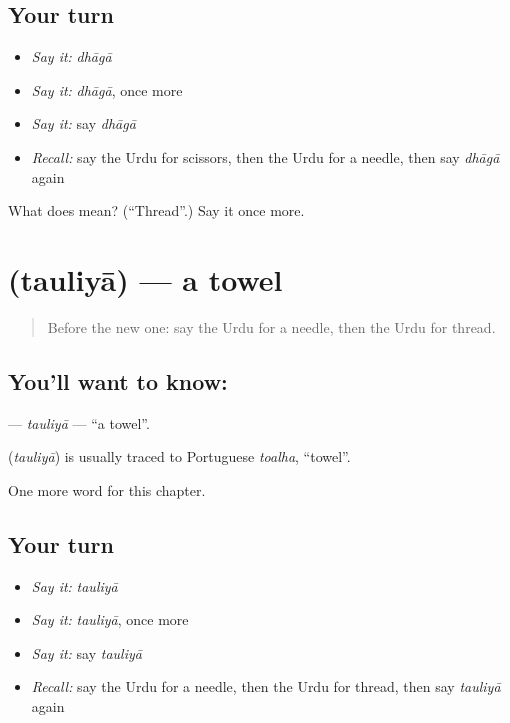 \subsection*{Your turn}
\begin{itemize}
\raggedright
  \item \emph{Say it:} \emph{dhāgā}
  \item \emph{Say it:} \emph{dhāgā}, once more
  \item \emph{Say it:} say \emph{dhāgā}
  \item \emph{Recall:} say the Urdu for scissors, then the Urdu for a needle, then say \emph{dhāgā} again
\end{itemize}

\begin{tcolorbox}[breakable,colback=teal!4,colframe=teal!35!black,title={Before you move on}]
What does  mean? (\textquotedblleft{}Thread\textquotedblright{}.) Say it once more.
\end{tcolorbox}
\section[\texorpdfstring{\ur{تولیہ} (tauliyā)}{تولیہ (tauliyā)}]{ (tauliyā) — a towel}

\label{lesson:UR-C106-tauliya}



\begin{quote}
Before the new one: say the Urdu for a needle, then the Urdu for thread.
\end{quote}

\subsection*{You'll want to know: }
\textbf{} — \emph{tauliyā} — \textquotedblleft{}a towel\textquotedblright{}.

\begin{cousinweb}
\textbf{} (\emph{tauliyā}) is usually traced to Portuguese \emph{toalha}, \textquotedblleft{}towel\textquotedblright{}.
\end{cousinweb}

\begin{grammarlens}[title={What you've built}]
One more word for this chapter.
\end{grammarlens}

\subsection*{Your turn}
\begin{itemize}
\raggedright
  \item \emph{Say it:} \emph{tauliyā}
  \item \emph{Say it:} \emph{tauliyā}, once more
  \item \emph{Say it:} say \emph{tauliyā}
  \item \emph{Recall:} say the Urdu for a needle, then the Urdu for thread, then say \emph{tauliyā} again
\end{itemize}

